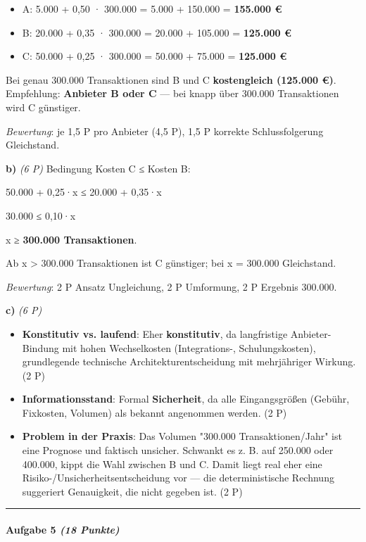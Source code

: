 \documentclass[11pt, a4paper]{article}
\begin{document}
\begin{itemize}
  \item A: 5.000 + 0,50 · 300.000 = 5.000 + 150.000 = \textbf{155.000 €}
  \item B: 20.000 + 0,35 · 300.000 = 20.000 + 105.000 = \textbf{125.000 €}
  \item C: 50.000 + 0,25 · 300.000 = 50.000 + 75.000 = \textbf{125.000 €}
\end{itemize}
Bei genau 300.000 Transaktionen sind B und C \textbf{kostengleich (125.000 €)}. Empfehlung: \textbf{Anbieter B oder C} — bei knapp über 300.000 Transaktionen wird C günstiger.

\textit{Bewertung}: je 1,5 P pro Anbieter (4,5 P), 1,5 P korrekte Schlussfolgerung Gleichstand.


\textbf{b)} \textit{(6 P)} Bedingung Kosten C ≤ Kosten B:

50.000 + 0,25·x ≤ 20.000 + 0,35·x

30.000 ≤ 0,10·x

x ≥ \textbf{300.000 Transaktionen}.

Ab x > 300.000 Transaktionen ist C günstiger; bei x = 300.000 Gleichstand.

\textit{Bewertung}: 2 P Ansatz Ungleichung, 2 P Umformung, 2 P Ergebnis 300.000.


\textbf{c)} \textit{(6 P)}

\begin{itemize}
  \item \textbf{Konstitutiv vs. laufend}: Eher \textbf{konstitutiv}, da langfristige Anbieter-Bindung mit hohen Wechselkosten (Integrations-, Schulungskosten), grundlegende technische Architekturentscheidung mit mehrjähriger Wirkung. (2 P)
  \item \textbf{Informationsstand}: Formal \textbf{Sicherheit}, da alle Eingangsgrößen (Gebühr, Fixkosten, Volumen) als bekannt angenommen werden. (2 P)
  \item \textbf{Problem in der Praxis}: Das Volumen "300.000 Transaktionen/Jahr" ist eine Prognose und faktisch unsicher. Schwankt es z. B. auf 250.000 oder 400.000, kippt die Wahl zwischen B und C. Damit liegt real eher eine Risiko-/Unsicherheitsentscheidung vor — die deterministische Rechnung suggeriert Genauigkeit, die nicht gegeben ist. (2 P)
\end{itemize}


\noindent\textcolor{rulegray}{\rule{\linewidth}{0.4pt}}


\paragraph{Aufgabe 5 \textit{(18 Punkte)}}\mbox{}\\[2pt]
\end{document}
